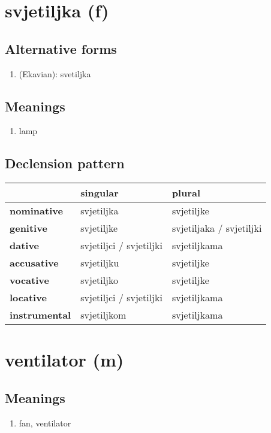 \filbreak
\section{svjetiljka (f)}
\subsection*{Alternative forms}
\begin{enumerate}
\item (Ekavian): svetiljka
\end{enumerate}
\subsection*{Meanings}
\begin{enumerate}
\item lamp
\end{enumerate}
\subsection*{Declension pattern}
\begin{tabularx}{\linewidth}{Xll}
\toprule
{} &                 singular &                    plural \\
\midrule
\textbf{nominative  } &               svjetiljka &                svjetiljke \\
\textbf{genitive    } &               svjetiljke &  svjetiljaka / svjetiljki \\
\textbf{dative      } &  svjetiljci / svjetiljki &              svjetiljkama \\
\textbf{accusative  } &               svjetiljku &                svjetiljke \\
\textbf{vocative    } &               svjetiljko &                svjetiljke \\
\textbf{locative    } &  svjetiljci / svjetiljki &              svjetiljkama \\
\textbf{instrumental} &              svjetiljkom &              svjetiljkama \\
\bottomrule
\end{tabularx}

\filbreak
\section{ventilator (m)}
\subsection*{Meanings}
\begin{enumerate}
\item fan, ventilator
\end{enumerate}
